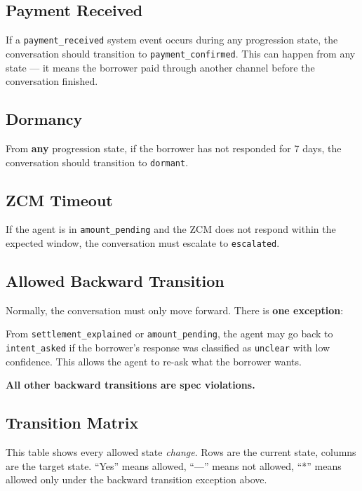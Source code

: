 \documentclass[11pt, a4paper]{article}
\begin{document}
\subsection{Payment Received}

If a \texttt{payment\_received} system event occurs during any progression state, the conversation should transition to \texttt{payment\_confirmed}. This can happen from any state --- it means the borrower paid through another channel before the conversation finished.

\subsection{Dormancy}

From \textbf{any} progression state, if the borrower has not responded for 7 days, the conversation should transition to \texttt{dormant}.

\subsection{ZCM Timeout}

If the agent is in \texttt{amount\_pending} and the ZCM does not respond within the expected window, the conversation must escalate to \texttt{escalated}.

\subsection{Allowed Backward Transition}

Normally, the conversation must only move forward. There is \textbf{one exception}:

From \texttt{settlement\_explained} or \texttt{amount\_pending}, the agent may go back to \texttt{intent\_asked} if the borrower's response was classified as \texttt{unclear} with low confidence. This allows the agent to re-ask what the borrower wants.

\textbf{All other backward transitions are spec violations.}

\subsection{Transition Matrix}
\label{sec:matrix}

This table shows every allowed state \textit{change}. Rows are the current state, columns are the target state. ``Yes'' means allowed, ``---'' means not allowed, ``*'' means allowed only under the backward transition exception above.
\end{document}
